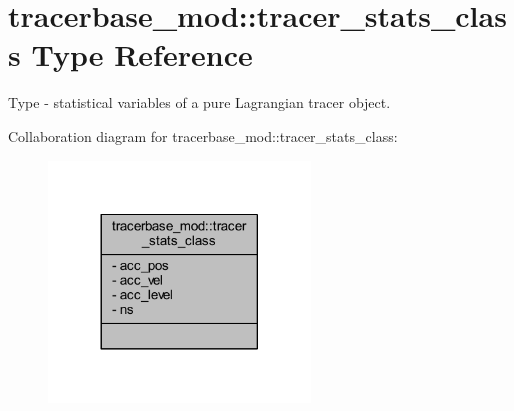 \hypertarget{structtracerbase__mod_1_1tracer__stats__class}{}\section{tracerbase\+\_\+mod\+:\+:tracer\+\_\+stats\+\_\+class Type Reference}
\label{structtracerbase__mod_1_1tracer__stats__class}


Type -\/ statistical variables of a pure Lagrangian tracer object.  




Collaboration diagram for tracerbase\+\_\+mod\+:\+:tracer\+\_\+stats\+\_\+class\+:\nopagebreak
\begin{figure}[H]
\begin{center}
\leavevmode
\includegraphics[width=197pt]{structtracerbase__mod_1_1tracer__stats__class__coll__graph}
\end{center}
\end{figure}
